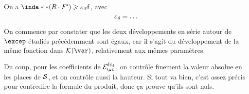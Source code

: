 \begin{lem}
  On a \( \inda**(R \cdot F') \ge \epsiv\delta \), avec
  \begin{equation}
    \varepsilon_4 = \dots
  \end{equation}
\end{lem}

\begin{ideas}
  On commence par constater que les deux développements en série autour de \(
    \excep \) étudiés précédemment sont égaux, car il s'agit du développement
  de la même fonction dans \( \korper\var \), relativement aux mêmes
  paramètres.

  Du coup, pour les coefficients de \( \stairs[\delta\epsiv] \), on contrôle
  finement la valeur absolue en les places de \( \mathcal S \), et on contrôle
  aussi la hauteur. Si tout va bien, c'est assez précis pour contredire la
  formule du produit, donc ça prouve qu'ils sont nuls.
\end{ideas}

\endinput

